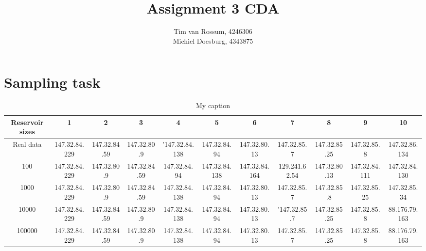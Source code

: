 \documentclass[]{article}
\title{Assignment 3 CDA}
\author{Tim van Rossum, 4246306\\
	Michiel Doesburg, 4343875}
\begin{document}
\maketitle

\section{Sampling task}
\begin{table}[]
\centering
\caption{My caption}
\label{my-label}
\begin{tabular}{|c|c|c|c|c|c|c|c|c|c|c|}
\hline
Reservoir sizes & 1             & 2                                   & 3                                    & 4                                    & 5                                     & 6                                     & 7                                     & 8                                    & 9                                     & 10                                    \\ \hline
Real data       & 147.32.84.229 & 147.32.84.59                        & 147.32.80.9                          & '147.32.84.138                       & 147.32.84.94                          & 147.32.80.13                          & 147.32.85.7                           & 147.32.85.25                         & 147.32.85.8                           & 147.32.86.134                         \\ \hline
100             & 147.32.84.229 & \cellcolor{red}147.32.80.9 & \cellcolor{red}147.32.84.59 & \cellcolor{red}147.32.84.94 & \cellcolor{red}147.32.84.138 & \cellcolor{red}147.32.84.164 & \cellcolor{red}129.241.62.54 & \cellcolor{red}147.32.80.13 & \cellcolor{red}147.32.84.111 & \cellcolor{red}147.32.84.130 \\ \hline
1000            & 147.32.84.229 & \cellcolor{red}147.32.80.9 & \cellcolor{red}147.32.84.59 & 147.32.84.138                        & 147.32.84.94                          & 147.32.80.13                          & 147.32.85.7                           & \cellcolor{red}147.32.85.8  & \cellcolor{red}147.32.85.25  & \cellcolor{red}147.32.85.34  \\ \hline
10000           & 147.32.84.229 & 147.32.84.59                        & 147.32.80.9                          & 147.32.84.138                        & 147.32.84.94                          & 147.32.80.13                          & '147.32.85.7                          & 147.32.85.25                         & 147.32.85.8                           & \cellcolor{red}88.176.79.163 \\ \hline
100000          & 147.32.84.229 & 147.32.84.59                        & 147.32.80.9                          & 147.32.84.138                        & 147.32.84.94                          & 147.32.80.13                          & 147.32.85.7                           & 147.32.85.25                         & 147.32.85.8                           & \cellcolor{red}88.176.79.163 \\ \hline
\end{tabular}
\end{table}
\end{document}
